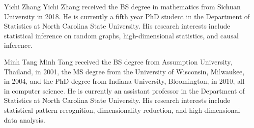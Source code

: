 \documentclass[10pt,journal,compsoc]{IEEEtran}
\numberwithin{equation}{section}
\begin{document}


\newpage
\begin{IEEEbiography}{Yichi Zhang}
Yichi Zhang received the BS degree in mathematics from Sichuan University in 2018. He is currently a fifth year PhD student in the Department of Statistics at North Carolina State University. His research interests include statistical inference on random graphs, high-dimensional statistics, and causal inference.
\end{IEEEbiography}
\begin{IEEEbiography}{Minh Tang}
    Minh Tang received the BS degree from Assumption University, Thailand, in 2001, the MS degree from the University of Wisconsin, Milwaukee, in 2004, and the PhD degree from Indiana University, Bloomington, in 2010, all in computer science. He is currently an assistant professor in the Department of Statistics at North Carolina State University. His research interests include statistical pattern recognition, dimensionality reduction, and high-dimensional data analysis.
\end{IEEEbiography}
\enlargethispage{-5in}
\newpage

\appendices
\onecolumn
\renewcommand\thesection{\Alph{section}}
\setcounter{section}{0}

\renewcommand{\thefigure}{\Alph{section}\arabic{figure}}
\setcounter{figure}{0}

\renewcommand{\thetable}{\Alph{section}\arabic{table}}
\setcounter{table}{0}

\renewcommand{\theequation}{\Alph{section}.\arabic{equation}}
\setcounter{equation}{0}

\renewcommand{\thelemma}{\Alph{section}\arabic{lemma}}
\setcounter{lemma}{0}
\end{document}
